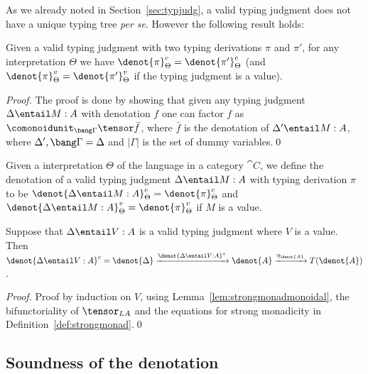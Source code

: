 \documentclass{llncs}
\begin{document}
As we already noted in Section~\ref{sec:typjudg}, a valid typing
judgment does not have a unique typing tree {\em per se}. However the
following result holds:




\begin{theorem}
  Given a valid typing judgment with two typing derivations $\pi$
  and $\pi'$, for any interpretation $\Theta$ we have
  $\denot{\pi}^c_\Theta = \denot{\pi'}^c_\Theta$ (and
  $\denot{\pi}^v_\Theta = \denot{\pi'}^v_\Theta$ if the typing
  judgment is a value).
\end{theorem}

\begin{proof}
  The proof is done by showing that given any typing judgment
  $\Delta\entail M:A$ with denotation $f$ one can factor $f$ as
  $\comonoidunit_{\bang\Gamma}\tensor
  \bar{f}$, where $\bar{f}$ is the denotation of $\Delta'\entail M:A$,
  where $\Delta',\bang\Gamma=\Delta$ and $|\Gamma|$ is the set of
  dummy variables.\qed
\end{proof}

\begin{definition}\label{def:typjudgdenot}\rm
  Given a interpretation $\Theta$ of the language in a category
  $\cat{C}$, we define the denotation of a valid typing judgment
  $\Delta\entail M:A$ with typing derivation $\pi$ to be
  $\denot{\Delta\entail M:A}^c_\Theta = \denot{\pi}^c_\Theta$ and
  $\denot{\Delta\entail M:A}^v_\Theta = \denot{\pi}^v_\Theta$ if $M$
  is a value.
\end{definition}



\begin{lemma}\label{lem:valuemonad}
  Suppose that $\Delta\entail V:A$ is a valid typing judgment where
  $V$ is a value. Then $\denot{\Delta\entail
  V:A}^c= \denot{\Delta} \xrightarrow{\denot{\Delta\entail V:A}^v} \denot{A}
  \xrightarrow{\eta_{\denot{A}}} T(\denot{A})$.
\end{lemma}

\begin{proof}
  Proof by induction on $V$, using
  Lemma~\ref{lem:strongmonadmonoidal}, the bifunctoriality of
  $\tensor_{LA}$ and the equations for strong monadicity in
  Definition~\ref{def:strongmonad}.\qed
\end{proof}

\subsection{Soundness of the denotation}
\end{document}
